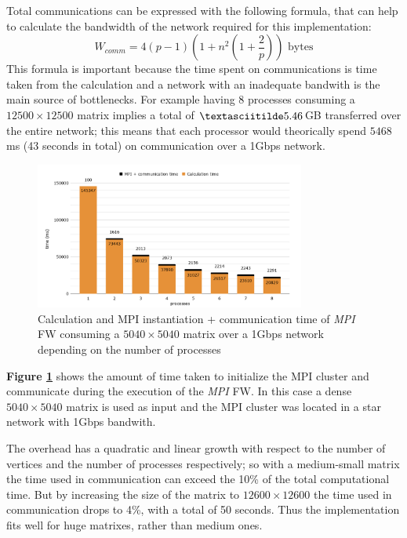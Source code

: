 Total communications can be expressed with the following formula, that can help to calculate the bandwidth of the network required
for this implementation:
\[W_{comm} = 4(p-1)(1 + n^2(1 + \frac{2}{p})) \text{ bytes}\]
This formula is important because the time spent on communications is time taken from the calculation and a network with an inadequate
bandwith is the main source of bottlenecks. For example having 8 processes consuming a $12500 \times 12500$ matrix implies a total of
$\textasciitilde 5.46$GB transferred  over the entire network; this means that each processor would theorically spend $5468$ms (43 seconds in total) on communication over a 1Gbps network.

\begin{figure}[h!]
\centering                                                                        
\includegraphics[width=3.5in]{diagrams/mpi-time}
\captionsetup{justification=centering}                                                                                                                                   
\caption{Calculation and MPI instantiation + communication time of \emph{MPI} FW consuming a $5040\times5040$ matrix over a 1Gbps network depending on the number of processes}
\label{fig:mpi-time}                                                                                                                                                           
\end{figure}

\textbf{Figure \ref*{fig:mpi-time}} shows the amount of time taken to initialize the MPI cluster and communicate during the execution of the \emph{MPI} FW. In this case a dense 
$5040\times5040$ matrix is used as input and the MPI cluster was located in a star network with 1Gbps bandwith.

The overhead has a quadratic and linear growth with respect to the number of vertices and the number of processes respectively; 
so with a medium-small matrix the time used in communication can exceed the 10\% of the total computational time. 
But by increasing the size of the matrix to $12600\times12600$ the time used in communication drops to 4\%, with a total of 50 seconds. Thus the implementation fits well for huge matrixes, rather than medium ones.

